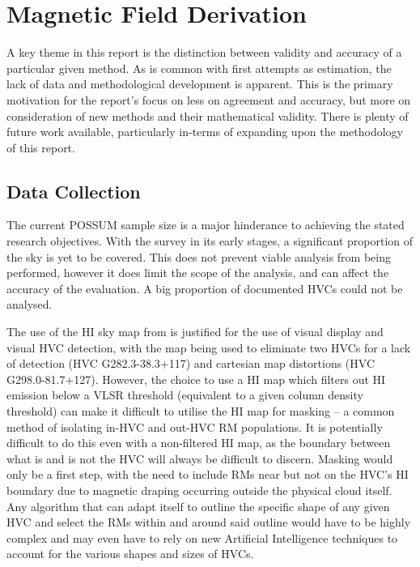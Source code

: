 \section{Magnetic Field Derivation}
\label{sec:mag_disc}

A key theme in this report is the distinction between validity and accuracy of a particular given method. As is common with first attempts as estimation, the lack of data and methodological development is apparent. This is the primary motivation for the report's focus on less on agreement and accuracy, but more on consideration of new methods and their mathematical validity. There is plenty of future work available, particularly in-terms of expanding upon the methodology of this report.

\subsection{Data Collection}
\label{ssec:B1}

The current POSSUM sample size is a major hinderance to achieving the stated research objectives. With the survey in its early stages, a significant proportion of the sky is yet to be covered. This does not prevent viable analysis from being performed, however it does limit the scope of the analysis, and can affect the accuracy of the evaluation. A big proportion of documented HVCs could not be analysed.


The use of the HI sky map from \cite{ID6} is justified for the use of visual display and visual HVC detection, with the map being used to eliminate two HVCs for a lack of detection (HVC G282.3-38.3+117) and cartesian map distortions (HVC G298.0-81.7+127). However, the choice to use a HI map which filters out HI emission below a VLSR threshold (equivalent to a given column density threshold) can make it difficult to utilise the HI map for masking – a common method of isolating in-HVC and out-HVC RM populations. It is potentially difficult to do this even with a non-filtered HI map, as the boundary between what is and is not the HVC will always be difficult to discern. Masking would only be a first step, with the need to include RMs near but not on the HVC's HI boundary due to magnetic draping occurring outside the physical cloud itself. Any algorithm that can adapt itself to outline the specific shape of any given HVC and select the RMs within and around said outline would have to be highly complex and may even have to rely on new Artificial Intelligence techniques to account for the various shapes and sizes of HVCs.


